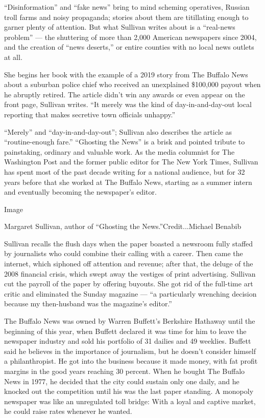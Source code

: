 ``Disinformation'' and ``fake news'' bring to mind scheming operatives,
Russian troll farms and noisy propaganda; stories about them are
titillating enough to garner plenty of attention. But what Sullivan
writes about is a ``real-news problem'' --- the shuttering of more than
2,000 American newspapers since 2004, and the creation of ``news
deserts,'' or entire counties with no local news outlets at all.

She begins her book with the example of a 2019 story from The Buffalo
News about a suburban police chief who received an unexplained \$100,000
payout when he abruptly retired. The article didn't win any awards or
even appear on the front page, Sullivan writes. ``It merely was the kind
of day-in-and-day-out local reporting that makes secretive town
officials unhappy.''

``Merely'' and ``day-in-and-day-out''; Sullivan also describes the
article as ``routine-enough fare.'' ``Ghosting the News'' is a brisk and
pointed tribute to painstaking, ordinary and valuable work. As the media
columnist for The Washington Post and the former public editor for The
New York Times, Sullivan has spent most of the past decade writing for a
national audience, but for 32 years before that she worked at The
Buffalo News, starting as a summer intern and eventually becoming the
newspaper's editor.

Image

Margaret Sullivan, author of ``Ghosting the News.''Credit...Michael
Benabib

Sullivan recalls the flush days when the paper boasted a newsroom fully
staffed by journalists who could combine their calling with a career.
Then came the internet, which siphoned off attention and revenue; after
that, the deluge of the 2008 financial crisis, which swept away the
vestiges of print advertising. Sullivan cut the payroll of the paper by
offering buyouts. She got rid of the full-time art critic and eliminated
the Sunday magazine --- ``a particularly wrenching decision because my
then-husband was the magazine's editor.''

The Buffalo News was owned by Warren Buffett's Berkshire Hathaway until
the beginning of this year, when Buffett declared it was time for him to
leave the newspaper industry and sold his portfolio of 31 dailies and 49
weeklies. Buffett said he believes in the importance of journalism, but
he doesn't consider himself a philanthropist. He got into the business
because it made money, with fat profit margins in the good years
reaching 30 percent. When he bought The Buffalo News in 1977, he decided
that the city could sustain only one daily, and he knocked out the
competition until his was the last paper standing. A monopoly newspaper
was like an unregulated toll bridge: With a loyal and captive market, he
could raise rates whenever he wanted.

